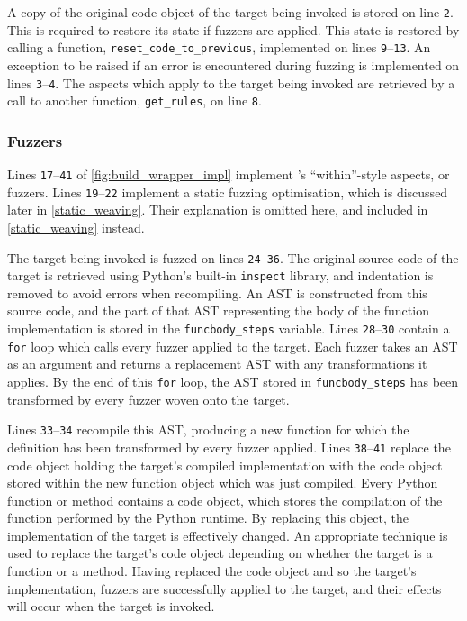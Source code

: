 A copy of the original code object of the target being invoked is stored on line
\texttt{2}. This is required to restore its state if fuzzers are applied. This
state is restored by calling a function, \lstinline{reset_code_to_previous},
implemented on lines \texttt{9}--\texttt{13}. An exception to be raised if an
error is encountered during fuzzing is implemented on lines
\texttt{3}--\texttt{4}. The aspects which apply to the target being invoked are
retrieved by a call to another function, \lstinline{get_rules}, on line
\texttt{8}. 

\subsubsection{Fuzzers}

Lines \texttt{17}--\texttt{41} of \cref{fig:build_wrapper_impl} implement
\pdsfthree{}'s ``within''-style aspects, or fuzzers. 
Lines \texttt{19}--\texttt{22} implement a static fuzzing optimisation, which is
discussed later in \cref{static_weaving}. Their explanation is omitted here, and
included in \cref{static_weaving} instead.

The target being invoked is fuzzed on lines \texttt{24}--\texttt{36}. The
original source code of the target is retrieved using Python's built-in
\lstinline{inspect} library, and indentation is removed to avoid errors when
recompiling. An AST is constructed from this source code, and the part of that
AST representing the body of the function implementation is stored in the
\lstinline{funcbody_steps} variable. Lines \texttt{28}--\texttt{30} contain a
\lstinline{for} loop which calls every fuzzer applied to the target. Each fuzzer
takes an AST as an argument and returns a replacement AST with any
transformations it applies. By the end of this \lstinline{for} loop, the AST
stored in \lstinline{funcbody_steps} has been transformed by every fuzzer woven
onto the target.

Lines \texttt{33}--\texttt{34} recompile this AST, producing a new function for
which the definition has been transformed by every fuzzer applied. Lines
\texttt{38}--\texttt{41} replace the code object holding the target's compiled
implementation with the code object stored within the new function object which
was just compiled. Every Python function or method contains a code object, which
stores the compilation of the function performed by the Python runtime. By
replacing this object, the implementation of the target is effectively changed.
An appropriate technique is used to replace the target's code object depending
on whether the target is a function or a method. Having replaced the code object
and so the target's implementation, fuzzers are successfully applied to the
target, and their effects will occur when the target is invoked.


